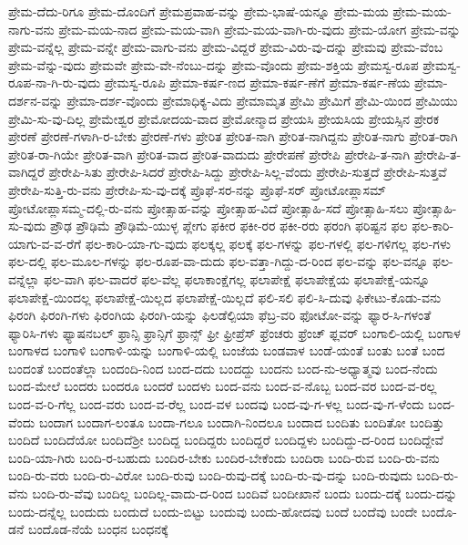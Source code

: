 {ಪ್ರೇಮ-ದೆದು-ರಿಗೂ
ಪ್ರೇಮ-ದೊಂದಿಗೆ
ಪ್ರೇಮಪ್ರವಾಹ-ವನ್ನು
ಪ್ರೇಮ-ಭಾಷೆ-ಯನ್ನೂ
ಪ್ರೇಮ-ಮಯ
ಪ್ರೇಮ-ಮಯ-ನಾಗು-ವನು
ಪ್ರೇಮ-ಮಯ-ನಾದ
ಪ್ರೇಮ-ಮಯ-ವಾಗಿ
ಪ್ರೇಮ-ಮಯ-ವಾಗಿ-ರು-ವುದು
ಪ್ರೇಮ-ಯೋಗ
ಪ್ರೇಮ-ವನ್ನು
ಪ್ರೇಮ-ವನ್ನೆಲ್ಲ
ಪ್ರೇಮ-ವನ್ನೇ
ಪ್ರೇಮ-ವಾಗು-ವನು
ಪ್ರೇಮ-ವಿದ್ದರೆ
ಪ್ರೇಮ-ವಿರು-ವು-ದನ್ನು
ಪ್ರೇಮವು
ಪ್ರೇಮ-ವೆಂಬ
ಪ್ರೇಮ-ವೆನ್ನು-ವುದು
ಪ್ರೇಮವೇ
ಪ್ರೇಮ-ವೇ-ನೆಂಬು-ದನ್ನು
ಪ್ರೇಮ-ವೊಂದು
ಪ್ರೇಮ-ಶಕ್ತಿಯ
ಪ್ರೇಮಸ್ವ-ರೂಪ
ಪ್ರೇಮಸ್ವ-ರೂಪ-ನಾ-ಗಿ-ರು-ವುದು
ಪ್ರೇಮಸ್ವ-ರೂಪಿ
ಪ್ರೇಮಾ-ಕರ್ಷ-ಣದ
ಪ್ರೇಮಾ-ಕರ್ಷ-ಣೆಗೆ
ಪ್ರೇಮಾ-ಕರ್ಷ-ಣೆಯ
ಪ್ರೇಮಾ-ದರ್ಶನ-ವನ್ನು
ಪ್ರೇಮಾ-ದರ್ಶ-ವೊಂದು
ಪ್ರೇಮಾಧಿಕ್ಯ-ವಿದು
ಪ್ರೇಮಾಮೃತ
ಪ್ರೇಮಿ
ಪ್ರೇಮಿಗೆ
ಪ್ರೇಮಿ-ಯಿಂದ
ಪ್ರೇಮಿಯು
ಪ್ರೇಮಿ-ಸು-ವು-ದಿಲ್ಲ
ಪ್ರೇಮೇಶ್ವರ
ಪ್ರೇಮೋದಯ-ವಾದ
ಪ್ರೇಮೋನ್ಮಾದ
ಪ್ರೇಯಸಿ
ಪ್ರೇಯಸಿಯ
ಪ್ರೇಯಸ್ಸಿನ
ಪ್ರೇರಕ
ಪ್ರೇರಣೆ
ಪ್ರೇರಣೆ-ಗಳಾಗಿ-ರ-ಬೇಕು
ಪ್ರೇರಣೆ-ಗಳು
ಪ್ರೇರಿತ
ಪ್ರೇರಿತ-ನಾಗಿ
ಪ್ರೇರಿತ-ನಾಗಿದ್ದನು
ಪ್ರೇರಿತ-ನಾಗು
ಪ್ರೇರಿತ-ರಾಗಿ
ಪ್ರೇರಿತ-ರಾ-ಗಿಯೇ
ಪ್ರೇರಿತ-ವಾಗಿ
ಪ್ರೇರಿತ-ವಾದ
ಪ್ರೇರಿತ-ವಾದುದು
ಪ್ರೇರೇಪಣೆ
ಪ್ರೇರೇಪಿ
ಪ್ರೇರೇಪಿ-ತ-ನಾಗಿ
ಪ್ರೇರೇಪಿ-ತ-ವಾಗಿದ್ದರೆ
ಪ್ರೇರೇಪಿ-ಸಿತು
ಪ್ರೇರೇಪಿ-ಸಿದರೆ
ಪ್ರೇರೇಪಿ-ಸಿದ್ದು
ಪ್ರೇರೇಪಿ-ಸಿಲ್ಲ-ವೆಂದು
ಪ್ರೇರೇಪಿ-ಸುತ್ತದೆ
ಪ್ರೇರೇಪಿ-ಸುತ್ತವೆ
ಪ್ರೇರೇಪಿ-ಸುತ್ತಿ-ರು-ವನು
ಪ್ರೇರೇಪಿ-ಸು-ವು-ದಕ್ಕೆ
ಪ್ರೊಫೆ-ಸರ-ನನ್ನು
ಪ್ರೊಫೆ-ಸರ್
ಪ್ರೋಟೋಪ್ಲಾಸಮ್
ಪ್ರೋಟೋಪ್ಲಾಸಮ್ಮ-ದಲ್ಲಿ-ರು-ವನು
ಪ್ರೋತ್ಸಾಹ-ವನ್ನು
ಪ್ರೋತ್ಸಾಹ-ವಿದೆ
ಪ್ರೋತ್ಸಾಹಿ-ಸದೆ
ಪ್ರೋತ್ಸಾಹಿ-ಸಲು
ಪ್ರೋತ್ಸಾಹಿ-ಸು-ವುದು
ಪ್ರೌಢ
ಪ್ರೌಢಿಮೆ
ಪ್ರೌಢಿಮೆ-ಯುಳ್ಳ
ಪ್ಲೇಗು
ಫಕೀರ
ಫಕೀ-ರರ
ಫಕೀ-ರರು
ಫರಂಗಿ
ಫರಿಷ್ಟನ
ಫಲ
ಫಲ-ಕಾರಿ-ಯಾಗು-ವ-ವ-ರೆಗೆ
ಫಲ-ಕಾರಿ-ಯಾ-ಗು-ವುದು
ಫಲಕ್ಕಲ್ಲ
ಫಲಕ್ಕೆ
ಫಲ-ಗಳನ್ನು
ಫಲ-ಗಳಲ್ಲಿ
ಫಲ-ಗಳಿಗಲ್ಲ
ಫಲ-ಗಳು
ಫಲ-ದಲ್ಲಿ
ಫಲ-ಮೂಲ-ಗಳನ್ನು
ಫಲ-ರೂಪ-ವಾ-ದುದು
ಫಲ-ವತ್ತಾ-ಗಿದ್ದು-ದ-ರಿಂದ
ಫಲ-ವನ್ನು
ಫಲ-ವನ್ನೂ
ಫಲ-ವನ್ನೆಲ್ಲಾ
ಫಲ-ವಾಗಿ
ಫಲ-ವಾದರೆ
ಫಲ-ವೆಲ್ಲ
ಫಲಾಕಾಂಕ್ಷೆಗಲ್ಲ
ಫಲಾಪೇಕ್ಷೆ
ಫಲಾಪೇಕ್ಷೆಯ
ಫಲಾಪೇಕ್ಷೆ-ಯನ್ನೂ
ಫಲಾಪೇಕ್ಷೆ-ಯಿಂದಲ್ಲ
ಫಲಾಪೇಕ್ಷೆ-ಯಿಲ್ಲದ
ಫಲಾಪೇಕ್ಷೆ-ಯಿಲ್ಲದೆ
ಫಲಿ-ಸಲಿ
ಫಲಿ-ಸಿ-ದುವು
ಫಿಕೇಟು-ಕೊಡು-ವನು
ಫಿರಂಗಿ
ಫಿರಂಗಿ-ಗಳು
ಫಿರಂಗಿಯ
ಫಿರಂಗಿ-ಯನ್ನು
ಫಿಲಡೆಲ್ಪಿಯಾ
ಫೆಬ್ರ-ವರಿ
ಫೋಟೋ-ವನ್ನು
ಫ್ಯಾರ-ಸಿ-ಗಳಂತೆ
ಫ್ಯಾರಿಸಿ-ಗಳು
ಫ್ಯಾಷನಬಲ್
ಫ್ರಾನ್ಸಿ
ಫ್ರಾನ್ಸಿಗೆ
ಫ್ರಾನ್ಸ್
ಫ್ರೀ
ಫ್ರೀಪ್ರೆಸ್
ಫ್ರೆಂಚರು
ಫ್ರೆಂಚ್
ಫ್ಲವರ್
ಬಂಗಾಲಿ-ಯಲ್ಲಿ
ಬಂಗಾಳ
ಬಂಗಾಳದ
ಬಂಗಾಳಿ
ಬಂಗಾಳಿ-ಯನ್ನು
ಬಂಗಾಳಿ-ಯಲ್ಲಿ
ಬಂಜೆಯ
ಬಂಡವಾಳ
ಬಂಡೆ-ಯಂತೆ
ಬಂತು
ಬಂತೆ
ಬಂದ
ಬಂದಂತೆ
ಬಂದಂತೆಲ್ಲಾ
ಬಂದಂದಿ-ನಿಂದ
ಬಂದ-ದದು
ಬಂದದ್ದು
ಬಂದನು
ಬಂದ-ನು-ಅಧ್ಯಾತ್ಮವು
ಬಂದ-ನೆಂದು
ಬಂದ-ಮೇಲೆ
ಬಂದರು
ಬಂದರೂ
ಬಂದರೆ
ಬಂದಳು
ಬಂದ-ವನು
ಬಂದ-ವ-ನೊಬ್ಬ
ಬಂದ-ವರ
ಬಂದ-ವ-ರಲ್ಲ
ಬಂದ-ವ-ರಿ-ಗೆಲ್ಲ
ಬಂದ-ವರು
ಬಂದ-ವ-ರೆಲ್ಲ
ಬಂದ-ವಳ
ಬಂದವು
ಬಂದ-ವು-ಗ-ಳಲ್ಲ
ಬಂದ-ವು-ಗ-ಳೆಂದು
ಬಂದ-ವೆಂದು
ಬಂದಾಗ
ಬಂದಾಗ-ಲಂತೂ
ಬಂದಾ-ಗಲೂ
ಬಂದಾಗಿ-ನಿಂದಲೂ
ಬಂದಾದ
ಬಂದಿತು
ಬಂದಿತೋ
ಬಂದಿತ್ತು
ಬಂದಿದೆ
ಬಂದಿದೆಯೋ
ಬಂದಿದೆಶ್ರೀ
ಬಂದಿದ್ದ
ಬಂದಿದ್ದರು
ಬಂದಿದ್ದರೆ
ಬಂದಿದ್ದಳು
ಬಂದಿದ್ದು-ದ-ರಿಂದ
ಬಂದಿದ್ದೇವೆ
ಬಂದಿ-ಯಾ-ಗಿರು
ಬಂದಿ-ರ-ಬಹುದು
ಬಂದಿರ-ಬೇಕು
ಬಂದಿರ-ಬೇಕೆಂದು
ಬಂದಿರಾ
ಬಂದಿ-ರುವ
ಬಂದಿ-ರು-ವನು
ಬಂದಿ-ರು-ವರು
ಬಂದಿ-ರು-ವಿರೋ
ಬಂದಿ-ರುವು
ಬಂದಿ-ರುವು-ದಕ್ಕೆ
ಬಂದಿ-ರು-ವು-ದನ್ನು
ಬಂದಿ-ರುವುದು
ಬಂದಿ-ರು-ವೆನು
ಬಂದಿ-ರು-ವೆವು
ಬಂದಿಲ್ಲ
ಬಂದಿಲ್ಲ-ವಾದು-ದ-ರಿಂದ
ಬಂದಿವೆ
ಬಂದೀಖಾನೆ
ಬಂದು
ಬಂದು-ದಕ್ಕೆ
ಬಂದು-ದನ್ನು
ಬಂದು-ದನ್ನೆಲ್ಲ
ಬಂದುದು
ಬಂದುದೆ
ಬಂದು-ಬಿಟ್ಟು
ಬಂದುವು
ಬಂದು-ಹೋದವು
ಬಂದೆ
ಬಂದೆವು
ಬಂದೇ
ಬಂದೊ-ಡನೆ
ಬಂದೊಡ-ನೆಯೆ
ಬಂಧನ
ಬಂಧನಕ್ಕೆ
}
